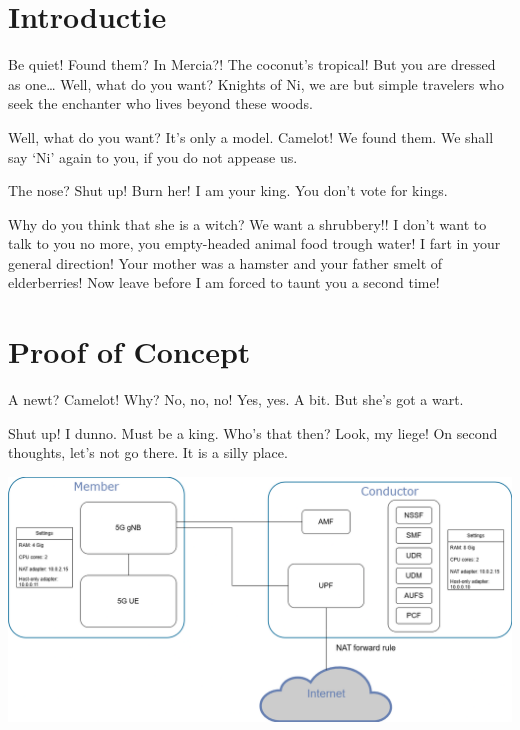 \documentclass[a0,portrait]{hogent-poster}
\begin{document}
\begin{multicols}{2} %

\section{Introductie}

Be quiet! Found them? In Mercia?! The coconut's tropical! But you are dressed as one… Well, what do you want? Knights of Ni, we are but simple travelers who seek the enchanter who lives beyond these woods.

Well, what do you want? It's only a model. Camelot! We found them. We shall say `Ni' again to you, if you do not appease us.

The nose? Shut up! Burn her! I am your king. You don't vote for kings.

Why do you think that she is a witch? We want a shrubbery!! I don't want to talk to you no more, you empty-headed animal food trough water! I fart in your general direction! Your mother was a hamster and your father smelt of elderberries! Now leave before I am forced to taunt you a second time!

\section{Proof of Concept}

A newt? Camelot! Why? No, no, no! Yes, yes. A bit. But she's got a wart.

Shut up! I dunno. Must be a king. Who's that then? Look, my liege! On second thoughts, let's not go there. It is a silly place.


\begin{center}
  \captionsetup{type=figure}
  \includegraphics[width=1.0\linewidth]{./graphics/POC-setup.png}
\end{center}



\end{multicols}
\end{document}
